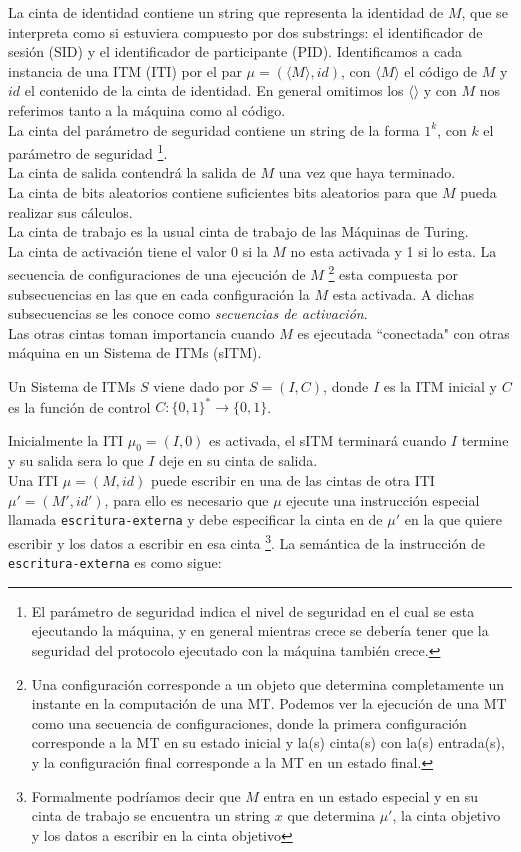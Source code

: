 La cinta de identidad contiene un string que representa la identidad de $M$, que se interpreta
como si estuviera compuesto por dos substrings: el identificador de sesión (SID) y el identificador
de participante (PID). Identificamos a cada instancia de una ITM (ITI) por el par
$\mu = (\langle M \rangle, id)$, con $\langle M \rangle$ el código de $M$ y $id$ el contenido de la cinta
de identidad. En general omitimos los $\langle \rangle$ y con $M$ nos referimos tanto a la máquina como
al código.\\
La cinta del parámetro de seguridad contiene un string de la forma $1^k$, con $k$ el parámetro de seguridad 
\footnote{El parámetro de seguridad indica el nivel de seguridad en el cual se esta ejecutando
la máquina, y en general mientras crece se debería tener que la seguridad del protocolo ejecutado
con la máquina también crece.}.\\
La cinta de salida contendrá la salida de $M$ una vez que haya terminado.\\
La cinta de bits aleatorios contiene suficientes bits aleatorios para que $M$ pueda realizar sus cálculos.\\
La cinta de trabajo es la usual cinta de trabajo de las Máquinas de Turing.\\
La cinta de activación tiene el valor 0 si la $M$ no esta activada y 1 si lo esta. La secuencia de
configuraciones de una ejecución de $M$
\footnote{Una configuración corresponde a un objeto que determina completamente un instante
en la computación de una MT. Podemos ver la ejecución de una MT como una secuencia de configuraciones, donde la
primera configuración corresponde a la MT en su estado inicial y la(s) cinta(s) con la(s) entrada(s), y la
configuración final corresponde a la MT en un estado final.}
esta compuesta por subsecuencias en las
que en cada configuración la $M$ esta activada. A dichas subsecuencias se les conoce como \textit{secuencias
de activación}.\\
Las otras cintas toman importancia cuando $M$ es ejecutada ``conectada" con otras máquina
en un Sistema de ITMs (sITM).\\

\begin{definicion}
Un Sistema de ITMs $S$ viene dado por $S = (I, C)$, donde $I$ es la ITM inicial y $C$ es la función
de control $C:\{0,1\}^* \to \{0,1\}$.
\end{definicion}
Inicialmente la ITI $\mu_0 = (I, 0)$ es activada, el sITM terminará cuando $I$ termine y su
salida sera lo que $I$ deje en su cinta de salida.\\
Una ITI $\mu = (M, id)$ puede escribir en una de las cintas de otra ITI $\mu' = (M', id')$, 
para ello es necesario que $\mu$ ejecute una instrucción
especial llamada \texttt{escritura-externa} y debe especificar la cinta en de $\mu'$ en la que quiere
escribir y los datos a escribir en esa cinta
\footnote{Formalmente podríamos decir que $M$ entra en un estado especial y en su cinta de
trabajo se encuentra un string $x$ que determina $\mu'$, la cinta objetivo y los datos a escribir
en la cinta objetivo}.
La semántica de la instrucción de \texttt{escritura-externa} es como sigue:\\

